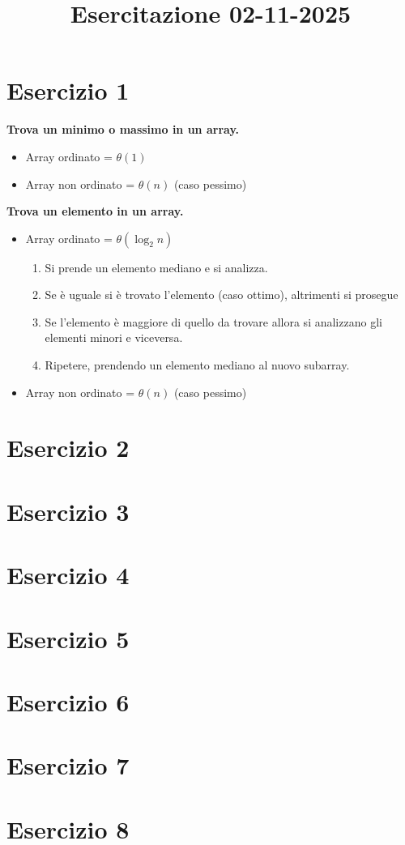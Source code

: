 \documentclass[a4paper,12pt]{article}
\title{Esercitazione 02-11-2025}
\author{}
\date{}
\let\oldsection\section
\renewcommand{\section}{\clearpage\oldsection}
\begin{document}
\maketitle
\tableofcontents

\section{Esercizio 1}
\textbf{Trova un minimo o massimo in un array.}\\
\begin{itemize}
    \item Array ordinato = $\theta(1)$
    \item Array non ordinato = $\theta(n)$ (caso pessimo)
\end{itemize}
\textbf{Trova un elemento in un array.}
\begin{itemize}
    \item Array ordinato = $\theta(\log_2n)$
    \begin{enumerate}
        \item Si prende un elemento mediano e si analizza.
        \item Se è uguale si è trovato l'elemento (caso ottimo), altrimenti si prosegue
        \item Se l'elemento è maggiore di quello da trovare allora si analizzano gli elementi minori e viceversa.
        \item Ripetere, prendendo un elemento mediano al nuovo subarray.
    \end{enumerate}
    \item Array non ordinato = $\theta(n)$ (caso pessimo)
\end{itemize}


\section{Esercizio 2}

\section{Esercizio 3}

\section{Esercizio 4}

\section{Esercizio 5}

\section{Esercizio 6}

\section{Esercizio 7}

\section{Esercizio 8}
\end{document}
